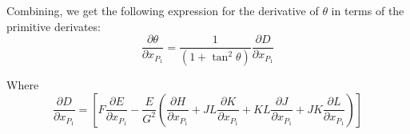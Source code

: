 \documentclass[a4paper,twocolumn,9pt]{article}
\begin{document}
Combining, we get the following expression for the derivative of
$\theta$ in terms of the primitive derivates:
\begin{displaymath}
  \frac{\partial \theta}{\partial x_{P_1}} = \frac{1}{(1+\tan^2\theta)} \frac{\partial D}{\partial x_{P_1}}
\end{displaymath}

Where 
\begin{displaymath}
  \frac{\partial D}{\partial x_{P_1}} = [F \frac{\partial E}{\partial x_{P_1}} -\frac{E}{G^2} (\frac{\partial H}{\partial x_{P_1}} + JL \frac{\partial K}{\partial x_{P_1}} + KL  \frac{\partial J}{\partial x_{P_1}} + JK  \frac{\partial L}{\partial x_{P_1}})]  
\end{displaymath}
\end{document}
